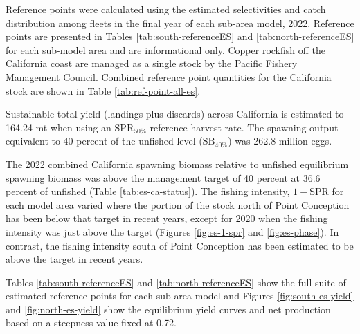 \documentclass[11pt,
  english,
  letterpaper,
]{article}
\begin{document}
Reference points were calculated using the estimated selectivities and catch distribution among fleets in the final year of each sub-area model, 2022. Reference points are presented in Tables \ref{tab:south-referenceES} and \ref{tab:north-referenceES} for each sub-model area and are informational only. Copper rockfish off the California coast are managed as a single stock by the Pacific Fishery Management Council. Combined reference point quantities for the California stock are shown in Table \ref{tab:ref-point-all-es}.

Sustainable total yield (landings plus discards) across California is estimated to 164.24 mt when using an \(\text{SPR}_{50\%}\) reference harvest rate. The spawning output equivalent to 40 percent of the unfished level (\(\text{SB}_{40\%}\)) was 262.8 million eggs.

The 2022 combined California spawning biomass relative to unfished equilibrium spawning biomass was above the management target of 40 percent at 36.6 percent of unfished (Table \ref{tab:es-ca-status}). The fishing intensity, \(1-\text{SPR}\) for each model area varied where the portion of the stock north of Point Conception has been below that target in recent years, except for 2020 when the fishing intensity was just above the target (Figures \ref{fig:es-1-spr} and \ref{fig:es-phase}). In contrast, the fishing intensity south of Point Conception has been estimated to be above the target in recent years.

Tables \ref{tab:south-referenceES} and \ref{tab:north-referenceES} show the full suite of estimated reference points for each sub-area model and Figures \ref{fig:south-es-yield} and \ref{fig:north-es-yield} show the equilibrium yield curves and net production based on a steepness value fixed at 0.72.

\newpage



\newpage



\begingroup\fontsize{10}{12}\selectfont
\begingroup\fontsize{10}{12}\selectfont
\end{document}
